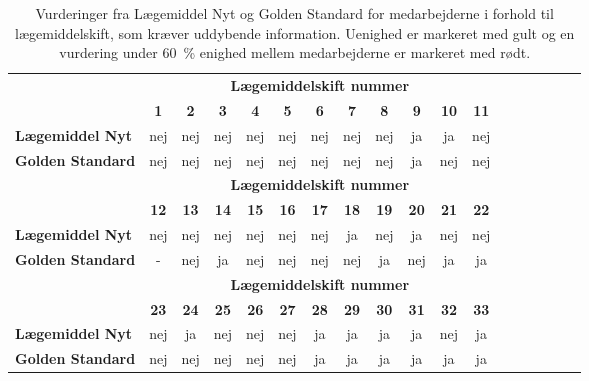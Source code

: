 \begin{table}[H]
\caption{Vurderinger fra Lægemiddel Nyt og Golden Standard for medarbejderne i forhold til lægemiddelskift, som kræver uddybende information. Uenighed er markeret med gult og en vurdering under 60~\% enighed mellem medarbejderne er markeret med rødt.}
\label{table:test1}
\centering
\begin{tabular}{l|c|c|c|c|c|c|c|c|c|c|c|c|c|c|c|c|c}
\rowcolor[HTML]{C0C0C0} \textbf{} & \multicolumn{11}{|c|}{\textbf{Lægemiddelskift nummer}} \\
\rowcolor[HTML]{C0C0C0} & \textbf{1} & \textbf{2} & \textbf{3} & \textbf{4} & \textbf{5} & \textbf{6} & \textbf{7} &  \textbf{8} & \textbf{9} & \textbf{10} & \textbf{11}   \\ \hline
\textbf{Lægemiddel Nyt} & nej & nej & nej & nej & nej & nej & nej & nej & ja &\cellcolor[HTML]{F6F6C3} ja & nej \\ \hline
\textbf{Golden Standard} & nej & nej & nej& nej & nej &nej & nej & nej& ja & \cellcolor[HTML]{F6F6C3}nej & nej \\ \hline
\rowcolor[HTML]{C0C0C0} & \multicolumn{11}{|c|}{\textbf{Lægemiddelskift nummer}} \\
\rowcolor[HTML]{C0C0C0} & \textbf{12} & \textbf{13} & \textbf{14} &  \textbf{15} & \textbf{16} & \textbf{17} & \textbf{18} & \textbf{19} & \textbf{20} & \textbf{21} & \textbf{22}  \\ \hline
\textbf{Lægemiddel Nyt} & nej & nej & \cellcolor[HTML]{F6F6C3}nej & nej & nej & nej & \cellcolor[HTML]{F6F6C3}ja & \cellcolor[HTML]{F6F6C3}nej & \cellcolor[HTML]{F6F6C3}ja & \cellcolor[HTML]{F6F6C3}nej & \cellcolor[HTML]{F6F6C3}nej\\ \hline
\textbf{Golden Standard} & \cellcolor[HTML]{F6E6E5} - & nej & \cellcolor[HTML]{F6F6C3}ja & nej & nej & nej & \cellcolor[HTML]{F6F6C3}nej & \cellcolor[HTML]{F6F6C3}ja & \cellcolor[HTML]{F6F6C3}nej & \cellcolor[HTML]{F6F6C3}ja & \cellcolor[HTML]{F6F6C3}ja \\ \hline
\rowcolor[HTML]{C0C0C0} & \multicolumn{11}{|c|}{\textbf{Lægemiddelskift nummer}} \\ 
\rowcolor[HTML]{C0C0C0} & \textbf{23} & \textbf{24} & \textbf{25} & \textbf{26} & \textbf{27} & \textbf{28} &  \textbf{29} & \textbf{30} & \textbf{31} & \textbf{32} & \textbf{33}  \\ \cline{1-10}
\textbf{Lægemiddel Nyt} & nej & \cellcolor[HTML]{F6F6C3}ja & nej & nej & nej & ja & ja & ja & ja & \cellcolor[HTML]{F6F6C3}nej & ja\\ \hline
\textbf{Golden Standard} & nej & \cellcolor[HTML]{F6F6C3}nej & nej & nej & nej & ja & ja& ja & ja& \cellcolor[HTML]{F6F6C3}ja & ja \\\hline
\end{tabular}
\end{table}

